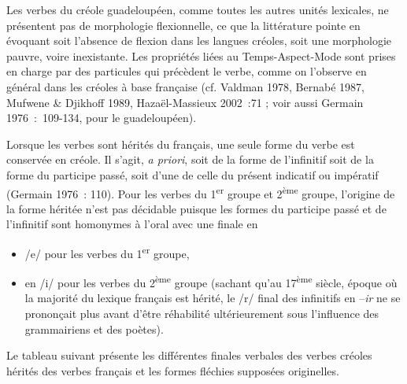 \documentclass[output=paper]{langsci/langscibook}
\begin{document}
Les verbes du créole guadeloupéen, comme toutes les autres unités
lexicales, ne présentent pas de morphologie flexionnelle, ce que la
littérature pointe en évoquant soit l'absence de flexion dans les
langues créoles, soit une morphologie pauvre, voire inexistante. Les
propriétés liées au Temps-Aspect-Mode sont prises en charge par des
particules qui précèdent le verbe, comme on l'observe en général dans
les créoles à base française (cf. Valdman 1978, Bernabé 1987, Mufwene \&
Djikhoff 1989, Hazaël-Massieux 2002~:71 ; voir aussi Germain
1976~:~109-134, pour le guadeloupéen).

Lorsque les verbes sont hérités du français, une seule forme du verbe
est conservée en créole. Il s'agit, \emph{a priori}, soit de la forme de
l'infinitif soit de la forme du participe passé, soit d'une de celle du
présent indicatif ou impératif (Germain 1976~: 110). Pour les verbes du
1\textsuperscript{er} groupe et 2\textsuperscript{ème} groupe, l'origine
de la forme héritée n'est pas décidable puisque les formes du participe
passé et de l'infinitif sont homonymes à l'oral avec une finale en

\begin{itemize}

\item
  /e/ pour les verbes du 1\textsuperscript{er} groupe,
\item
  en /i/ pour les verbes du 2\textsuperscript{ème} groupe (sachant qu'au
  17\textsuperscript{ème} siècle, époque où la majorité du lexique
  français est hérité, le /r/ final des infinitifs en --\emph{ir} ne se
  prononçait plus avant d'être réhabilité ultérieurement sous
  l'influence des grammairiens et des poètes).
\end{itemize}

Le tableau suivant présente les différentes finales verbales des verbes
créoles hérités des verbes français et les formes fléchies supposées
originelles.
\end{document}
